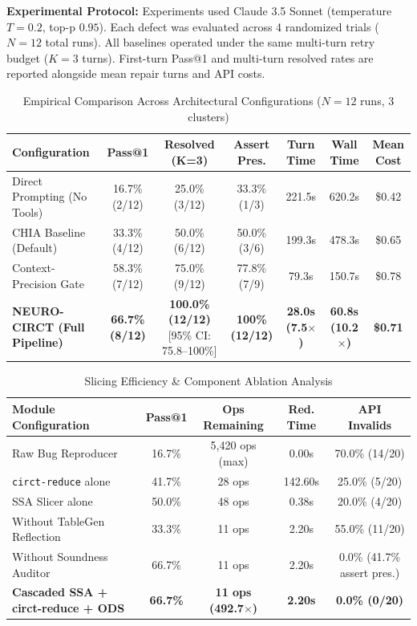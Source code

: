\documentclass[conference]{IEEEtran}
\begin{document}
\textbf{Experimental Protocol:} Experiments used Claude 3.5 Sonnet (temperature $T = 0.2$, top-p $0.95$). Each defect was evaluated across 4 randomized trials ($N = 12$ total runs). All baselines operated under the same multi-turn retry budget ($K = 3$ turns). First-turn Pass@1 and multi-turn resolved rates are reported alongside mean repair turns and API costs.

\begin{table}[t]
\centering
\caption{Empirical Comparison Across Architectural Configurations ($N = 12$ runs, 3 clusters)}
\label{tab:ablation}
\begin{tabular}{lcccccc}
\toprule
\textbf{Configuration} & \textbf{Pass@1} & \textbf{Resolved (K=3)} & \textbf{Assert Pres.} & \textbf{Turn Time} & \textbf{Wall Time} & \textbf{Mean Cost} \\
\midrule
Direct Prompting (No Tools) & 16.7\% (2/12) & 25.0\% (3/12) & 33.3\% (1/3) & 221.5s & 620.2s & \$0.42 \\
CHIA Baseline (Default) & 33.3\% (4/12) & 50.0\% (6/12) & 50.0\% (3/6) & 199.3s & 478.3s & \$0.65 \\
Context-Precision Gate & 58.3\% (7/12) & 75.0\% (9/12) & 77.8\% (7/9) & 79.3s & 150.7s & \$0.78 \\
\textbf{NEURO-CIRCT (Full Pipeline)} & \textbf{66.7\% (8/12)} & \textbf{100.0\% (12/12)} [95\% CI: 75.8--100\%] & \textbf{100\% (12/12)} & \textbf{28.0s (7.5$\times$)} & \textbf{60.8s (10.2$\times$)} & \textbf{\$0.71} \\
\bottomrule
\end{tabular}
\end{table}

\begin{table}[t]
\centering
\caption{Slicing Efficiency \& Component Ablation Analysis}
\label{tab:components}
\begin{tabular}{lcccc}
\toprule
\textbf{Module Configuration} & \textbf{Pass@1} & \textbf{Ops Remaining} & \textbf{Red. Time} & \textbf{API Invalids} \\
\midrule
Raw Bug Reproducer & 16.7\% & 5,420 ops (max) & 0.00s & 70.0\% (14/20) \\
\texttt{circt-reduce} alone & 41.7\% & 28 ops & 142.60s & 25.0\% (5/20) \\
SSA Slicer alone & 50.0\% & 48 ops & 0.38s & 20.0\% (4/20) \\
Without TableGen Reflection & 33.3\% & 11 ops & 2.20s & 55.0\% (11/20) \\
Without Soundness Auditor & 66.7\% & 11 ops & 2.20s & 0.0\% (41.7\% assert pres.) \\
\textbf{Cascaded SSA + circt-reduce + ODS} & \textbf{66.7\%} & \textbf{11 ops (492.7$\times$)} & \textbf{2.20s} & \textbf{0.0\% (0/20)} \\
\bottomrule
\end{tabular}
\end{table}
\end{document}
